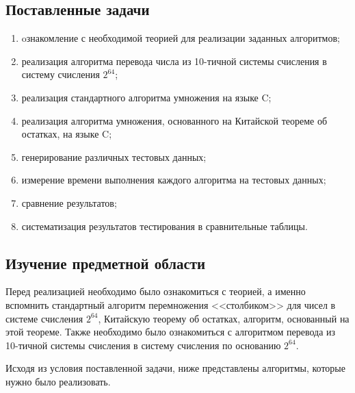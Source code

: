 \documentclass[14pt, russian]{scrartcl}
\begin{document}
\subsection{Поставленные задачи}
\begin{enumerate}
\item oзнакомление с необходимой теорией для реализации заданных алгоритмов;
\item реализация алгоритма перевода числа из 10-тичной системы счисления в систему счисления $2^{64}$;
\item реализация стандартного алгоритма умножения на языке C;
\item реализация алгоритма умножения, основанного на Китайской теореме об остатках, на языке C;
\item генерирование различных тестовых данных;
\item измерение времени выполнения каждого алгоритма на тестовых данных;
\item сравнение результатов;
\item систематизация результатов тестирования в сравнительные таблицы.
\end{enumerate}

\subsection{Изучение предметной области}
Перед реализацией необходимо было ознакомиться с теорией, а именно вспомнить стандартный алгоритм перемножения <<столбиком>> для чисел в системе счисления $2^{64}$, Китайскую теорему об остатках, алгоритм, основанный на этой теореме. Также необходимо было ознакомиться с алгоритмом перевода из 10-тичной системы счисления в систему счисления по основанию $2^{64}$.

Исходя из условия поставленной задачи, ниже представлены алгоритмы, которые нужно было реализовать.
\end{document}
